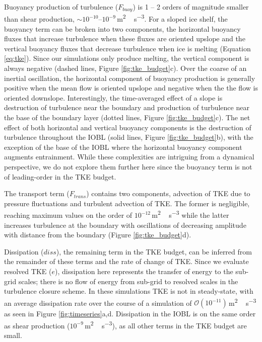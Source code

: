 \documentclass[tc, manuscript]{copernicus}
\begin{document}
Buoyancy production of turbulence ($F_{buoy}$) is 1 -- 2 orders of magnitude smaller than shear production, $\sim\!10^{-10} \textrm{--} 10^{-9}$\,\unit{m^2\,s^{-3}}. For a sloped ice shelf, the buoyancy term can be broken into two components, the horizontal buoyancy fluxes that increase turbulence when these fluxes are oriented upslope and the vertical buoyancy fluxes that decrease turbulence when ice is melting (Equation \ref{eq:tke}). Since our simulations only produce melting, the vertical component is always negative (dashed lines, Figure \ref{fig:tke_budget}c). Over the coarse of an inertial oscillation, the horizontal component of buoyancy production is generally positive when the mean flow is oriented upslope and negative when the the flow is oriented downslope. Interestingly, the time-averaged effect of a slope is destruction of turbulence near the boundary and production of turbulence near the base of the boundary layer (dotted lines, Figure \ref{fig:tke_budget}c). The net effect of both horizontal and vertical buoyancy components is the destruction of turbulence throughout the IOBL (solid lines, Figure \ref{fig:tke_budget}b), with the exception of the base of the IOBL where the horizontal buoyancy component augments entrainment. While these complexities are intriguing from a dynamical perspective, we do not explore them further here since the buoyancy term is not of leading-order in the TKE budget.

The transport term ($F_{trans}$) contains two components, advection of TKE due to pressure fluctuations and turbulent advection of TKE. The former is negligible, reaching maximum values on the order of $10^{-12}$\,\unit{m^2\,s^{-3}} while the latter increases turbulence at the boundary with oscillations of decreasing amplitude with distance from the boundary (Figure \ref{fig:tke_budget}d). 

Dissipation ($diss$), the remaining term in the TKE budget, can be inferred from the remainder of these terms and the rate of change of TKE. Since we evaluate resolved TKE ($e$), dissipation here represents the transfer of energy to the sub-grid scales; there is no flow of energy from sub-grid to resolved scales in the turbulence closure scheme. In these simulations TKE is not in steady-state, with an average  dissipation rate over the course of a simulation of $\mathcal{O}(10^{-11})$\,\unit{m^2\,s^{-3}} as seen in Figure \ref{fig:timeseries}a,d. Dissipation in the IOBL is on the same order as shear production ($10^{-9}$\,\unit{m^2\,s^{-3}}), as all other terms in the TKE budget are small. 
\end{document}
